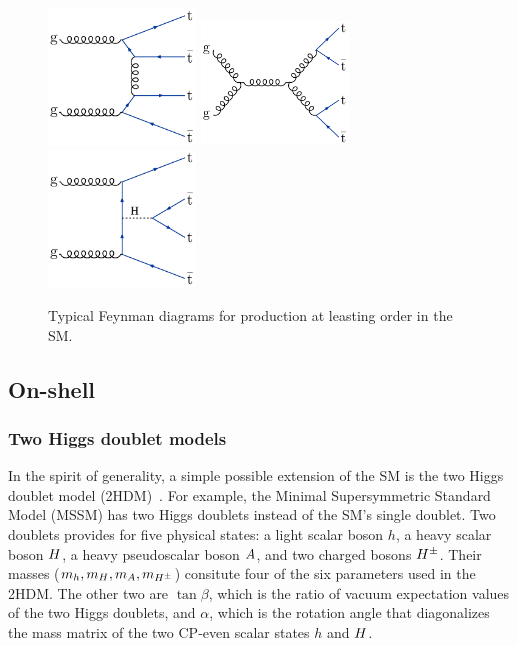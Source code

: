 \begin{figure}[!hbtp]
\centering
\includegraphics[width=0.35\textwidth]{figs/ftp/ftdiag1.pdf}
\includegraphics[width=0.35\textwidth]{figs/ftp/ftdiag2.pdf} \\
\includegraphics[width=0.35\textwidth]{figs/ftp/ftdiag3.pdf}
\caption{Typical Feynman diagrams for \tttt production at leasting order in the SM.}
\label{fig:ftdiags}
\end{figure}

\subsection{On-shell}

\subsubsection{Two Higgs doublet models}

In the spirit of generality, a simple possible extension of the SM 
is the two Higgs doublet model (2HDM)~\cite{THEORY:Branco2011iw}.
For example, the Minimal Supersymmetric Standard Model (MSSM)
has two Higgs doublets instead of the SM's single doublet.
Two doublets provides for five physical states: 
a light scalar boson $h$, a heavy scalar boson $H$, a heavy pseudoscalar boson $A$, and
two charged bosons $H^\pm$. Their masses ($m_h, m_H, m_A, m_{H^\pm}$)
consitute four of the six parameters used in the 2HDM. The other two are $\tan\beta$,
which is the ratio of vacuum expectation values of the two Higgs doublets,
and $\alpha$, which is the rotation angle that diagonalizes the mass matrix of the
two CP-even scalar states $h$ and $H$.

